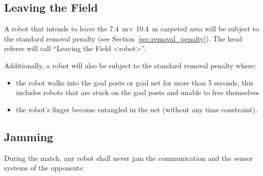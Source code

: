 \documentclass[12pt]{article}
\newcommand{\cf}{see\xspace}
\newcommand{\TotalWidth}{7.4~m\xspace}
\newcommand{\TotalLength}{10.4~m\xspace }
\begin{document}
\subsection{Leaving the Field}
\label{sec:leaving_field}

A robot that intends to leave the \TotalWidth $\times$ \TotalLength carpeted area will be subject to the standard removal penalty (\cf Section~\ref{sec:removal_penalty}).
The head referee will call ``Leaving the Field \textless robot\textgreater''.

Additionally, a robot will also be subject to the standard removal penalty where:
\begin{itemize}
\item the robot walks into the goal posts or goal net for more than 5 seconds, this includes robots that are stuck on the goal posts and unable to free themselves
\item the robot's finger become entangled in the net (without any time constraint).
\end{itemize}


\subsection{Jamming}
\label{sec:jamming}
During the match, any robot shall never jam the communication and the sensor systems of the opponents:
\end{document}
